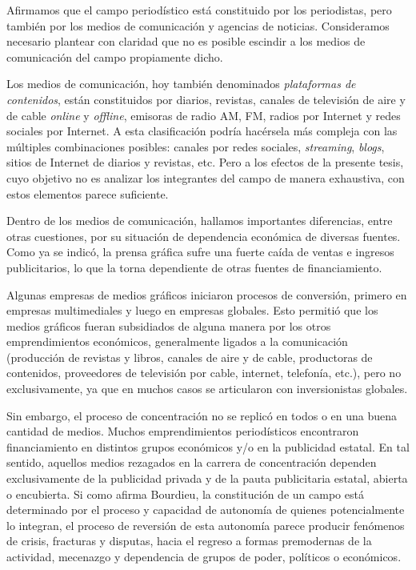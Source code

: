 {Afirmamos que el campo periodístico está constituido por los periodistas, pero también por los medios de comunicación y agencias de noticias. Consideramos necesario plantear con claridad que no es posible escindir a los medios de comunicación del campo propiamente dicho.

Los medios de comunicación, hoy también denominados \emph{plataformas de contenidos}, están constituidos por diarios, revistas, canales de televisión de aire y de cable \emph{online} y \emph{offline}, emisoras de radio AM, FM, radios por Internet y redes sociales por Internet. A esta clasificación podría hacérsela más compleja con las múltiples combinaciones posibles: canales por redes sociales, \emph{streaming}, \emph{blogs}, sitios de Internet de diarios y revistas, etc. Pero a los efectos de la presente tesis, cuyo objetivo no es analizar los integrantes del campo de manera exhaustiva, con estos elementos parece suficiente.

Dentro de los medios de comunicación, hallamos importantes diferencias, entre otras cuestiones, por su situación de dependencia económica de diversas fuentes. Como ya se indicó, la prensa gráfica sufre una fuerte caída de ventas e ingresos publicitarios, lo que la torna dependiente de otras fuentes de financiamiento.

Algunas empresas de medios gráficos iniciaron procesos de conversión, primero en empresas multimediales y luego en empresas globales. Esto permitió que los medios gráficos fueran subsidiados de alguna manera por los otros emprendimientos económicos, generalmente ligados a la comunicación (producción de revistas y libros, canales de aire y de cable, productoras de contenidos, proveedores de televisión por cable, internet, telefonía, etc.), pero no exclusivamente, ya que en muchos casos se articularon con inversionistas globales.

Sin embargo, el proceso de concentración no se replicó en todos o en una buena cantidad de medios. Muchos emprendimientos periodísticos encontraron financiamiento en distintos grupos económicos y/o en la publicidad estatal. En tal sentido, aquellos medios rezagados en la carrera de concentración dependen exclusivamente de la publicidad privada y de la pauta publicitaria estatal, abierta o encubierta. Si como afirma Bourdieu, la constitución de un campo está determinado por el proceso y capacidad de autonomía de quienes potencialmente lo integran, el proceso de reversión de esta autonomía parece producir fenómenos de crisis, fracturas y disputas, hacia el regreso a formas premodernas de la actividad, mecenazgo y dependencia de grupos de poder, políticos o económicos.

}
